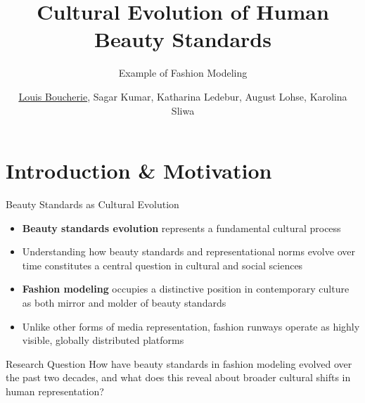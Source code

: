 \documentclass[aspectratio=169,xcolor=dvipsnames,10pt]{beamer}
\title{Cultural Evolution of Human Beauty Standards}
\subtitle{Example of Fashion Modeling}
\author{ \hspace{0.1em}\underline{Louis Boucherie}, Sagar Kumar, Katharina Ledebur, August Lohse, Karolina Sliwa}
\begin{document}
\begin{frame}
    \titlepage
\end{frame}


\section{Introduction \& Motivation}

\begin{frame}{Beauty Standards as Cultural Evolution}
    \begin{itemize}
        \item \textbf{Beauty standards evolution} represents a fundamental cultural process
        \pause \item Understanding how beauty standards and representational norms evolve over time constitutes a central question in cultural and social sciences
        \pause \item  \textbf{Fashion modeling} occupies a distinctive position in contemporary culture as both mirror and molder of beauty standards
        \pause\item Unlike other forms of media representation, fashion runways operate as highly visible, globally distributed platforms
    \end{itemize}
    
    \pause \begin{exampleblock}{Research Question}
        How have beauty standards in fashion modeling evolved over the past two decades, and what does this reveal about broader cultural shifts in human representation?
    \end{exampleblock}
\end{frame}

        
        
\end{document}
